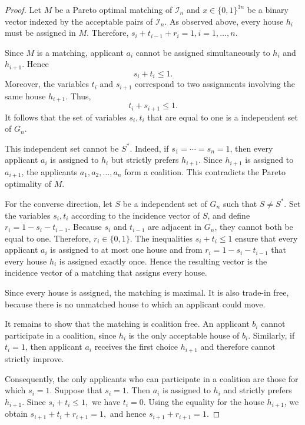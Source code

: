 \documentclass[12pt]{report}
\numberwithin{algorithm}{chapter}
\begin{document}
	\begin{proof}
		Let $M$ be a Pareto optimal matching of $\mathcal{I}_n$ and $x\in\{0,1\}^{3n}$ be a binary vector indexed by the acceptable pairs of $\mathcal{I}_n$. As observed above, every house $h_i$ must be assigned in $M$. Therefore,
		$s_i+t_{i-1}+r_i=1, i=1,\ldots,n.$
		
		Since $M$ is a matching, applicant $a_i$ cannot be assigned simultaneously to $h_i$ and $h_{i+1}$. Hence
		\[
		s_i+t_i\le 1.
		\]
		Moreover, the variables $t_i$ and $s_{i+1}$ correspond to two assignments involving the same house $h_{i+1}$. Thus,
		\[
		t_i+s_{i+1}\le 1.
		\]
		It follows that the set of variables $s_i,t_i$ that are equal to one is a independent set of $G_{n}$.
		
		
		This independent set cannot be $S^{*}$. Indeed, if
		$s_1=\cdots=s_n=1$, then every applicant $a_i$ is assigned to $h_i$ but strictly prefers $h_{i+1}$. Since $h_{i+1}$ is assigned to $a_{i+1}$, the applicants $a_1,a_2,\ldots,a_n$ form a coalition. This contradicts the Pareto optimality of $M$.
		
		For the converse direction, let $S$ be a independent set of $G_{n}$ such that $S\ne S^{*}$. Set the variables $s_i,t_i$ according to the incidence vector of $S$, and define $r_i=1-s_i-t_{i-1}.$ Because $s_i$ and $t_{i-1}$ are adjacent in $G_{n}$, they cannot both be equal to one. Therefore, $r_i\in\{0,1\}.$ The inequalities
		$s_i+t_i\le 1$ ensure that every applicant $a_i$ is assigned to at most one house and from $r_i=1-s_i-t_{i-1}$ that every house $h_i$ is assigned exactly once. Hence the resulting vector is the incidence vector of a matching that assigns every house.
		
		Since every house is assigned, the matching is maximal. It is also trade-in free, because there is no unmatched house to which an applicant could move.
		
		It remains to show that the matching is coalition free. An applicant $b_i$ cannot participate in a coalition, since $h_i$ is the only acceptable house of $b_i$. Similarly, if $t_i=1$, then applicant $a_i$ receives the first choice $h_{i+1}$ and therefore cannot strictly improve.
		
		Consequently, the only applicants who can participate in a coalition are those for which $s_i=1$. Suppose that $s_i=1$. Then $a_i$ is assigned to $h_i$ and strictly prefers $h_{i+1}$. Since
		$s_i+t_i\le 1,$
		we have $t_i=0$. Using the equality for the house $h_{i+1}$, we obtain
		$s_{i+1}+t_i+r_{i+1}=1,$
		and hence
		$s_{i+1}+r_{i+1}=1.$
		

\end{proof}
\end{document}
